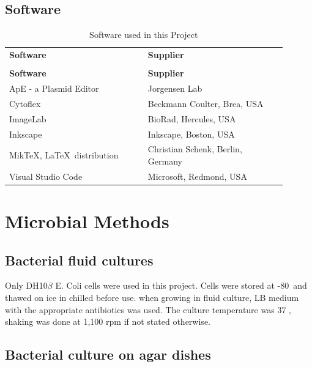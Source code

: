 \subsection{Software}

\begin{longtable}{L{0.45\linewidth} R{0.45\linewidth}}
\caption{Software used in this Project}
\label{tab:software}
\\
\toprule
{}
\textbf{Software}& \textbf{Supplier}\\                           
\midrule
\endfirsthead
{}
\caption[]{Software used in this Project}
\\
\midrule
{}
\textbf{Software}& \textbf{Supplier}\\ 
\midrule
\endhead
\bottomrule
\endfoot
ApE - a Plasmid Editor & Jorgensen Lab \\
Cytoflex & Beckmann Coulter, Brea, USA \\
ImageLab & BioRad, Hercules, USA \\
Inkscape & Inkscape, Boston, USA \\
MikTeX, \LaTeX \ distribution & Christian Schenk, Berlin, Germany \\
Visual Studio Code & Microsoft, Redmond, USA \\


\end{longtable}

\newpage

\section{Microbial Methods}

\subsection{Bacterial fluid cultures}

Only DH10\(\beta\) E. Coli cells were used in this project. Cells were stored at -80\C \ and thawed on ice in chilled  before use. when growing in fluid culture, LB medium with the appropriate antibiotics was used. The culture temperature was 37 \C, shaking was done at 1,100 rpm if not stated otherwise.

\subsection{Bacterial culture on agar dishes}

